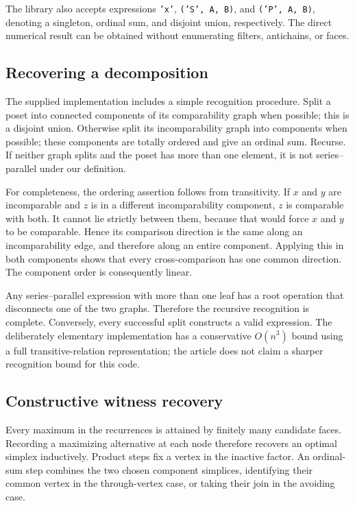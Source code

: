 \documentclass[11pt]{article}
\theoremstyle{definition}
\begin{document}
The library also accepts expressions \texttt{'x'}, \texttt{('S', A, B)}, and \texttt{('P', A, B)}, denoting a singleton, ordinal sum, and disjoint union, respectively. The direct numerical result can be obtained without enumerating filters, antichains, or faces.

\subsection{Recovering a decomposition}
The supplied implementation includes a simple recognition procedure. Split a poset into connected components of its comparability graph when possible; this is a disjoint union. Otherwise split its incomparability graph into components when possible; these components are totally ordered and give an ordinal sum. Recurse. If neither graph splits and the poset has more than one element, it is not series--parallel under our definition.

For completeness, the ordering assertion follows from transitivity. If $x$ and $y$ are incomparable and $z$ is in a different incomparability component, $z$ is comparable with both. It cannot lie strictly between them, because that would force $x$ and $y$ to be comparable. Hence its comparison direction is the same along an incomparability edge, and therefore along an entire component. Applying this in both components shows that every cross-comparison has one common direction. The component order is consequently linear.

Any series--parallel expression with more than one leaf has a root operation that disconnects one of the two graphs. Therefore the recursive recognition is complete. Conversely, every successful split constructs a valid expression. The deliberately elementary implementation has a conservative $O(n^3)$ bound using a full transitive-relation representation; the article does not claim a sharper recognition bound for this code.

\subsection{Constructive witness recovery}
Every maximum in the recurrences is attained by finitely many candidate faces. Recording a maximizing alternative at each node therefore recovers an optimal simplex inductively. Product steps fix a vertex in the inactive factor. An ordinal-sum step combines the two chosen component simplices, identifying their common vertex in the through-vertex case, or taking their join in the avoiding case.
\end{document}
